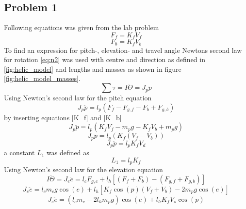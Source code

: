 \subsection{Problem 1}
Following equations was given from the lab problem
    \begin{equation} \label{K_f}
    F_f = K_f V_f
    \end{equation}
    \begin{equation} \label{K_b}
    F_b = K_f V_b
    \end{equation}
To find an expression for pitch-, elevation- and travel angle Newtons second law for rotation \eqref{eq:n2} was used with centre and direction as defined in \cref{fig:helic_model} and lengths and masses as shown in figure \ref{fig:helic_model_masses}.
    \begin{equation}\label{eq:n2}
     \sum \tau = I \ddot \Theta = J_p \ddot p
    \end{equation}
Using Newton's second law for the pitch equation
    \begin{equation*}\label{eg of pitc}
        J_p \ddot p = l_p  (F_f -  F_{g,f} -  F_b +   F_{g,b})
    \end{equation*}
by inserting equations \eqref{K_f} and \eqref{K_b}
    \begin{equation*}
        J_p \ddot p = l_p  (K_f V_f - m_p g - K_f V_b + m_p g)
    \end{equation*}
    \begin{equation*}
        J_p \ddot p = l_p  (K_f (V_f - V_b))
    \end{equation*}
    \begin{equation*} 
        J_p \ddot p = l_p K_f  V_d 
    \end{equation*}
a constant $L_1$ was defined as
    \begin{equation}\label{con:L_1}
        L_1 = l_p  K_f 
    \end{equation}
Using Newton's second law for the elevation equation
    \begin{equation*}\label{eq of angle}
        I \ddot \Theta = J_e \ddot e = l_c F_{g,c} + l_h [( F_f + F_b) - (F_{g,f} + F_{g,b})]
    \end{equation*}
    \begin{equation*}
        J_e \ddot e = l_c  m_c  g \cos(e) + l_h[K_f\cos(p)(V_f+ V_b) -2 m_p g\cos(e)]
    \end{equation*}
    \begin{equation*}
        J_e \ddot e = (l_c m_c - 2l_h m_pg)\cos(e) + l_h K_f V_s \cos(p)
    \end{equation*}

